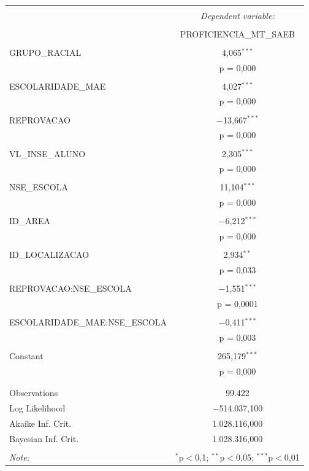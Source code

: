 \begin{table}[!htbp] \centering 
  \caption{} 
  \label{} 
\begin{tabular}{@{\extracolsep{5pt}}lc} 
\\[-1.8ex]\hline 
\hline \\[-1.8ex] 
 & \multicolumn{1}{c}{\textit{Dependent variable:}} \\ 
\cline{2-2} 
\\[-1.8ex] & PROFICIENCIA\_MT\_SAEB \\ 
\hline \\[-1.8ex] 
 GRUPO\_RACIAL & 4,065$^{***}$ \\ 
  & p = 0,000 \\ 
  & \\ 
 ESCOLARIDADE\_MAE & 4,027$^{***}$ \\ 
  & p = 0,000 \\ 
  & \\ 
 REPROVACAO & $-$13,667$^{***}$ \\ 
  & p = 0,000 \\ 
  & \\ 
 VL\_INSE\_ALUNO & 2,305$^{***}$ \\ 
  & p = 0,000 \\ 
  & \\ 
 NSE\_ESCOLA & 11,104$^{***}$ \\ 
  & p = 0,000 \\ 
  & \\ 
 ID\_AREA & $-$6,212$^{***}$ \\ 
  & p = 0,000 \\ 
  & \\ 
 ID\_LOCALIZACAO & 2,934$^{**}$ \\ 
  & p = 0,033 \\ 
  & \\ 
 REPROVACAO:NSE\_ESCOLA & $-$1,551$^{***}$ \\ 
  & p = 0,0001 \\ 
  & \\ 
 ESCOLARIDADE\_MAE:NSE\_ESCOLA & $-$0,411$^{***}$ \\ 
  & p = 0,003 \\ 
  & \\ 
 Constant & 265,179$^{***}$ \\ 
  & p = 0,000 \\ 
  & \\ 
\hline \\[-1.8ex] 
Observations & 99.422 \\ 
Log Likelihood & $-$514.037,100 \\ 
Akaike Inf. Crit. & 1.028.116,000 \\ 
Bayesian Inf. Crit. & 1.028.316,000 \\ 
\hline 
\hline \\[-1.8ex] 
\textit{Note:}  & \multicolumn{1}{r}{$^{*}$p$<$0,1; $^{**}$p$<$0,05; $^{***}$p$<$0,01} \\ 
\end{tabular} 
\end{table} 


